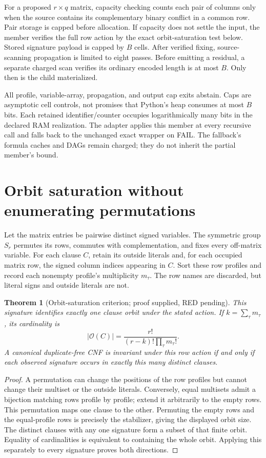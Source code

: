 \documentclass[11pt]{article}
\newtheorem{theorem}{Theorem}
\begin{document}
For a proposed $r\times q$ matrix, capacity checking counts each pair of
columns only when the source contains its complementary binary conflict in
a common row. Pair storage is capped before allocation. If capacity does not
settle the input, the member verifies the full row action by the exact
orbit-saturation test below. Stored signature payload is capped by $B$ cells.
After verified fixing, source-scanning propagation is limited to eight passes.
Before emitting a residual, a separate charged scan verifies its ordinary
encoded length is at most $B$. Only then is the child materialized.

All profile, variable-array, propagation, and output cap exits abstain.
Caps are asymptotic cell controls, not promises that Python's heap consumes
at most $B$ bits. Each retained identifier/counter occupies logarithmically
many bits in the declared RAM realization. The adapter applies this member
at every recursive call and falls back to the unchanged exact wrapper on
FAIL. The fallback's formula caches and DAGs remain charged; they do not
inherit the partial member's bound.

\section{Orbit saturation without enumerating permutations}
Let the matrix entries be pairwise distinct signed variables. The symmetric
group $S_r$ permutes its rows, commutes with complementation, and fixes every
off-matrix variable. For each clause $C$, retain its outside literals and,
for each occupied matrix row, the signed column indices appearing in $C$.
Sort these row profiles and record each nonempty profile's multiplicity
$m_\tau$. The row names are discarded, but literal signs and outside
literals are not.

\begin{theorem}[Orbit-saturation criterion; proof supplied, RED pending]
This signature identifies exactly one clause orbit under the stated action.
If $k=\sum_\tau m_\tau$, its cardinality is
\[
 |\mathcal O(C)|=
 \frac{r!}{(r-k)!\prod_\tau m_\tau!}.
\]
A canonical duplicate-free CNF is invariant under this row action if and only
if each observed signature occurs in exactly this many distinct clauses.
\end{theorem}
\begin{proof}
A permutation can change the positions of the row profiles but cannot change
their multiset or the outside literals. Conversely, equal multisets admit a
bijection matching rows profile by profile; extend it arbitrarily to the empty
rows. This permutation maps one clause to the other. Permuting the empty rows
and the equal-profile rows is precisely the stabilizer, giving the displayed
orbit size. The distinct clauses with any one signature form a subset of that
finite orbit. Equality of cardinalities is equivalent to containing the whole
orbit. Applying this separately to every signature proves both directions.
\end{proof}
\end{document}
